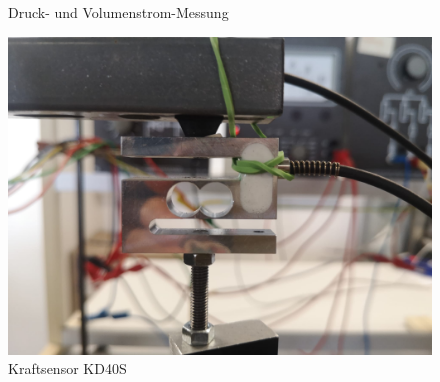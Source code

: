 \begin{figure}[H]
\begin{minipage}{0.49\textwidth}
		\caption{Druck- und Volumenstrom-Messung}	
		\label{fig:D-V-Messung}
	\end{minipage}
	\hfill
\begin{minipage}{0.49\textwidth}
	\centering
	\includegraphics[width=1\textwidth]{Abbildungen/Kraftsensor.jpeg}
	\caption{Kraftsensor KD40S}
	\label{fig:KD40S}
\end{minipage}
\end{figure}